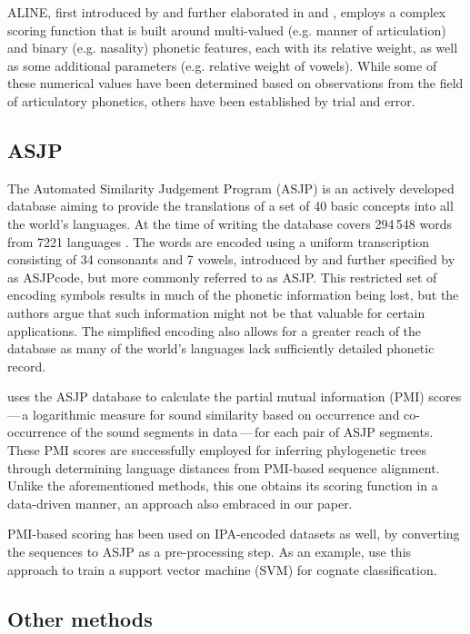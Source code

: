 \documentclass[a4paper]{report}
\begin{document}
ALINE, first introduced by \citet{2000_Kondrak} and further elaborated in \citet{2002_Kondrak_Hirst} and \citet{2003_Kondrak},
employs a complex scoring function that is built around multi-valued (e.g. manner of articulation) and binary (e.g. nasality) phonetic features,
each with its relative weight, as well as some additional parameters (e.g. relative weight of vowels).
While some of these numerical values have been determined based on observations from the field of articulatory phonetics,
others have been established by trial and error.


\subsection{ASJP}

The Automated Similarity Judgement Program (ASJP) is an actively developed database aiming to provide
the translations of a set of 40 basic concepts into all the world's languages.
At the time of writing the database covers 294\,548 words from 7221 languages \citep{2016_Wichmann_al}.
The words are encoded using a uniform transcription consisting of 34 consonants and 7 vowels,
introduced by \citet{2008_Brown_al} and further specified by \citet{2013_Brown_al} as ASJPcode, but more commonly referred to as ASJP.
This restricted set of encoding symbols results in much of the phonetic information being lost,
but the authors argue that such information might not be that valuable for certain applications.
The simplified encoding also allows for a greater reach of the database as many of the world's languages lack sufficiently detailed phonetic record.

\citet{2013_Jäger} uses the ASJP database to calculate the partial mutual information (PMI) scores\,---\,a logarithmic measure
for sound similarity based on occurrence and co-occurrence of the sound segments in data\,---\,for each pair of ASJP segments.
These PMI scores are successfully employed for inferring phylogenetic trees through determining language distances from PMI-based sequence alignment.
Unlike the aforementioned methods, this one obtains its scoring function in a data-driven manner, an approach also embraced in our paper.

PMI-based scoring has been used on IPA-encoded datasets as well, by converting the sequences to ASJP as a pre-processing step.
As an example, \citet{2016_Jäger_Sofroniev} use this approach to train a support vector machine (SVM) for cognate classification.


\subsection{Other methods}
\end{document}
